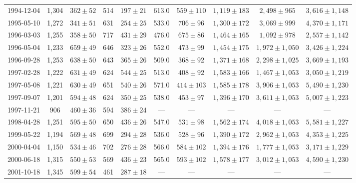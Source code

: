 \begin{landscape}
\begin{longtable}{cccccccccc}
{1994-12-04} & 1,304 & {$362  \pm  52$} & 514 & {$197 \pm 21$} & 613.0 & {$559 \pm 110$} & {$1,119 \pm 183$} & {$2,498 \pm 965$} & {$3,616 \pm 1,148$} \\
{1995-05-10} & 1,272 & {$341  \pm  51$} & 631 & {$254 \pm 25$} & 533.0 & {$706 \pm 96$} & {$1,300 \pm 172$} & {$3,069 \pm 999$} & {$4,370 \pm 1,171$} \\
{1996-03-03} & 1,255 & {$358  \pm  50$} & 717 & {$431 \pm 29$} & 476.0 & {$675 \pm 86$} & {$1,464 \pm 165$} & {$1,092 \pm 978$} & {$2,557 \pm 1,142$} \\
{1996-05-04} & 1,233 & {$659  \pm  49$} & 646 & {$323 \pm 26$} & 552.0 & {$473 \pm 99$} & {$1,454 \pm 175$} & {$1,972 \pm 1,050$} & {$3,426 \pm 1,224$} \\
{1996-09-28} & 1,253 & {$638  \pm  50$} & 643 & {$365 \pm 26$} & 509.0 & {$368 \pm 92$} & {$1,371 \pm 168$} & {$2,298 \pm 1,025$} & {$3,669 \pm 1,193$} \\
{1997-02-28} & 1,222 & {$631  \pm  49$} & 624 & {$544 \pm 25$} & 513.0 & {$408 \pm 92$} & {$1,583 \pm 166$} & {$1,467 \pm 1,053$} & {$3,050 \pm 1,219$} \\
{1997-05-08} & 1,221 & {$630  \pm  49$} & 651 & {$540 \pm 26$} & 571.0 & {$414 \pm 103$} & {$1,585 \pm 178$} & {$3,906 \pm 1,053$} & {$5,490 \pm 1,230$} \\
{1997-09-07} & 1,201 & {$594  \pm  48$} & 624 & {$350 \pm 25$} & 538.0 & {$453 \pm 97$} & {$1,396 \pm 170$} & {$3,611 \pm 1,053$} & {$5,007 \pm 1,223$} \\
{1997-11-21} & 906 & {$460  \pm  36$} & 594 & {$386 \pm 24$} & --- & --- & --- & --- & --- \\
{1998-04-28} & 1,251 & {$595  \pm  50$} & 650 & {$436 \pm 26$} & 547.0 & {$531 \pm 98$} & {$1,562 \pm 174$} & {$4,018 \pm 1,053$} & {$5,581 \pm 1,227$} \\
{1999-05-22} & 1,194 & {$569  \pm  48$} & 699 & {$294 \pm 28$} & 536.0 & {$528 \pm 96$} & {$1,390 \pm 172$} & {$2,962 \pm 1,053$} & {$4,353 \pm 1,225$} \\
{2000-04-04} & 1,150 & {$534  \pm  46$} & 702 & {$276 \pm 28$} & 566.0 & {$584 \pm 102$} & {$1,394 \pm 176$} & {$1,777 \pm 1,053$} & {$3,171 \pm 1,229$} \\
{2000-06-18} & 1,315 & {$550  \pm  53$} & 569 & {$436 \pm 23$} & 565.0 & {$593 \pm 102$} & {$1,578 \pm 177$} & {$3,012 \pm 1,053$} & {$4,590 \pm 1,230$} \\
{2001-10-18} & 1,345 & {$599  \pm  54$} & 461 & {$287 \pm 18$} & --- & --- & --- & --- & --- \\

\end{longtable}
\end{landscape}
